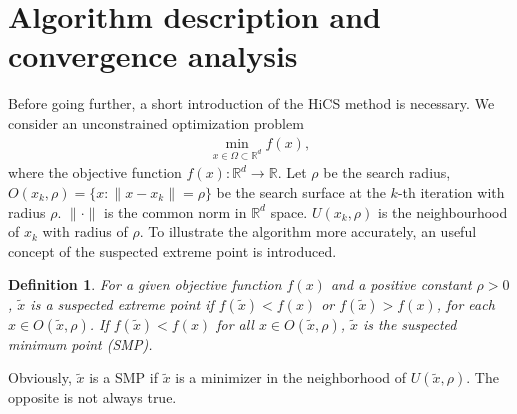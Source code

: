 \documentclass[final,1p,times]{elsarticle}
\newtheorem{definition}{Definition}
\def\bbR{\mathbb{R}}
\begin{document}
\section{Algorithm description and convergence analysis}
\label{sec:algorithm}

Before going further, a short introduction of the
HiCS method is necessary.
We consider an unconstrained optimization problem 
\begin{align}
	\min_{x\in\Omega\subset\mathbb{R}^d} f(x),
	\label{}
\end{align}
where the objective function $f(x):\bbR^d\rightarrow \bbR$.
Let $\rho$ be the search radius, $O(x_k, \rho)=\{x:
\|x-x_k \|=\rho\}$ be the search surface at the
$k$-th iteration with radius $\rho$. $\|\cdot \|$ is the common
norm in $\bbR^d$ space.  $U(x_k, \rho)$ is the neighbourhood of
$x_k$ with radius of $\rho$.  To illustrate the algorithm
more accurately, an useful concept of the suspected extreme point is
introduced.
\begin{definition}	
	For a given objective function $f(x)$ and a positive constant 
	$\rho>0$, $\tilde{x}$ is a suspected extreme point if
	$f(\tilde x)<f(x)$ or $f(\tilde x)>f(x)$, for each $x \in O(\tilde{x},\rho)$.
	If $f(\tilde x) < f(x)$ for all $x\in O(\tilde{x},\rho)$,
	$\tilde{x}$ is the suspected minimum point (SMP).
\end{definition}
Obviously, $\tilde{x}$ is a SMP if $\tilde{x}$ is a minimizer in
the neighborhood of $U(\tilde{x}, \rho)$. The opposite is not always true.
\end{document}

